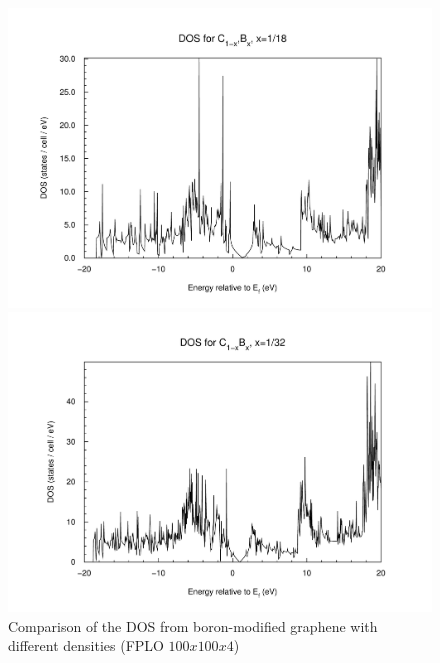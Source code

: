 \begin{figure}
\begin{minipage}[t]{0.3\textwidth}
					\end{minipage}
					\begin{minipage}[t]{0.3\textwidth}
						\includegraphics[width=\textwidth]{Results/Bor/Bor3/bor3dos.pdf}
					\end{minipage}
					\begin{minipage}[t]{0.3\textwidth}
						\includegraphics[width=\textwidth]{Results/Bor/Bor4/bor4dos.pdf}
					\end{minipage}															
					\caption{Comparison of the DOS from boron-modified graphene with different densities (FPLO $100x100x4$)}
					\label{fig:BoronDOSDensityComparisson}
				\end{figure}				
